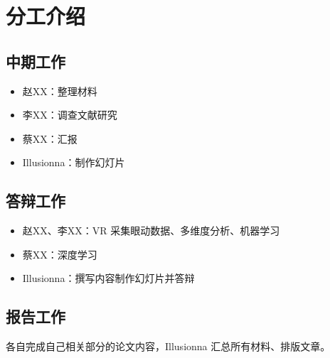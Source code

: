 \documentclass[12pt,hyperref,a4paper,UTF8]{ctexart}
\begin{document}
\cover

%
%

\thispagestyle{empty} %

\newpage
\tableofcontents

\newpage



\section{分工介绍}
\subsection{中期工作}

\begin{itemize}
    \item 赵XX：整理材料
    \item 李XX：调查文献研究
    \item 蔡XX：汇报
    \item Illusionna：制作幻灯片
\end{itemize}



\subsection{答辩工作}
\begin{itemize}
    \item 赵XX、李XX：VR 采集眼动数据、多维度分析、机器学习
    \item 蔡XX：深度学习
    \item Illusionna：撰写内容制作幻灯片并答辩
\end{itemize}



\subsection{报告工作}
各自完成自己相关部分的论文内容，Illusionna 汇总所有材料、\LaTeXe 排版文章。
\end{document}
